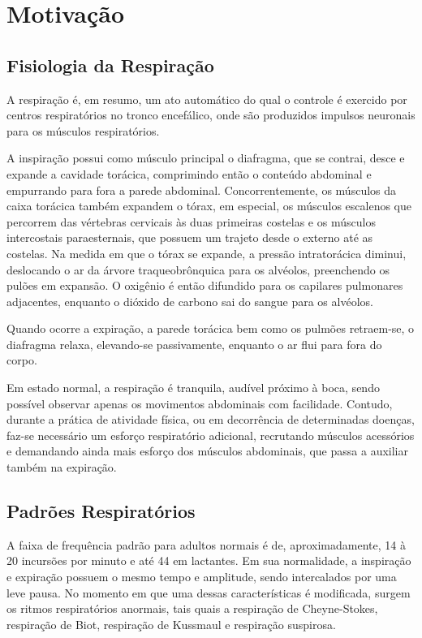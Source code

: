 \chapter{Motivação}
  
\section{Fisiologia da Respiração} \label{sec:fisiologiadarespiracao}

	A respiração é, em resumo, um ato automático do qual o controle é exercido por centros respiratórios no tronco encefálico, onde são produzidos impulsos neuronais para os músculos respiratórios. 
	
	A inspiração possui como músculo principal o diafragma, que se contrai, desce e expande a cavidade torácica, comprimindo então o conteúdo abdominal e empurrando para fora a parede abdominal. Concorrentemente, os músculos da caixa torácica também expandem o tórax, em especial, os músculos escalenos que percorrem das vértebras cervicais às duas primeiras costelas e os músculos intercostais paraesternais, que possuem um trajeto desde o externo até as costelas. Na medida em que o tórax se expande, a pressão intratorácica diminui, deslocando o ar da árvore traqueobrônquica para os alvéolos, preenchendo os pulões em expansão. O oxigênio é então difundido para os capilares pulmonares adjacentes, enquanto o dióxido de carbono sai do sangue para os alvéolos.
	
	Quando ocorre a expiração, a parede torácica bem como os pulmões retraem-se, o diafragma relaxa, elevando-se passivamente, enquanto o ar flui para fora do corpo.
	
	Em estado normal, a respiração é tranquila, audível próximo à boca, sendo possível observar apenas os movimentos abdominais com facilidade. Contudo, durante a prática de atividade física, ou em decorrência de determinadas doenças, faz-se necessário um esforço respiratório adicional, recrutando músculos acessórios e demandando ainda mais esforço dos músculos abdominais, que passa a auxiliar também na expiração.
	
\section{Padrões Respiratórios} \label{sec:padroesrespiratorios}

	A faixa de frequência padrão para adultos normais é de, aproximadamente, 14 à 20 incursões por minuto e até 44 em lactantes. Em sua normalidade, a inspiração e expiração possuem o mesmo tempo e amplitude, sendo intercalados por uma leve pausa. No momento em que uma dessas características é modificada, surgem os ritmos respiratórios anormais, tais quais a respiração de Cheyne-Stokes, respiração de Biot, respiração de Kussmaul e respiração suspirosa.
	
